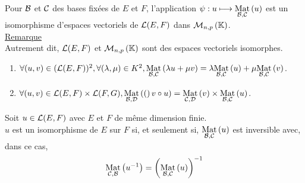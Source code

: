 \begin{defprop}
    Pour \(\cal{B}\) et \(\cal{C}\) des bases fixées de \(E\) et \(F\), l’application \(\psi : u \mapsto \Mat{\cal{B}, \cal{C}}{u}\) est un isomorphisme d’espaces vectoriels de \(\cal{L}(E, F )\) dans \(\M{n,p}\).\\
    \underline{Remarque} \\
    Autrement dit, \(\cal{L}(E, F )\) et \(\M{n,p}\) sont des espaces vectoriels isomorphes.
\end{defprop}


\begin{defprop}
    \begin{enumerate}
        \item \(\forall(u, v) \in (\cal{L}(E, F ))^2 , \forall(\lambda, \mu) \in K^2, \Mat{\cal{B}, \cal{C}}{\lambda u + \mu v} = \lambda \Mat{\cal{B}, \cal{C}}{u} + \mu \Mat{\cal{B}, \cal{C}}{v}\).
        \item \(\forall(u, v) \in \cal{L}(E, F ) \times \cal{L}(F, G), \Mat{\cal{B}, \cal{D}} (v \circ u) = \Mat{\cal{C}, \cal{D}}{v} \times \Mat{\cal{B}, \cal{C}}{u}\).
    \end{enumerate}
\end{defprop}

\begin{defprop}
    Soit \(u \in \cal{L}(E, F )\) avec \(E\) et \(F\) de même dimension finie.\\
    \(u\) est un isomorphisme de \(E\) sur \(F\) si, et seulement si, \(\Mat{\cal{B}, \cal{C}}{u}\) est inversible avec, dans ce cas,
    \[\Mat{\cal{C}, \cal{B}}{u^{-1}} =\paren{\Mat{\cal{B}, \cal{C}}{u}}^{-1}\]
\end{defprop}

